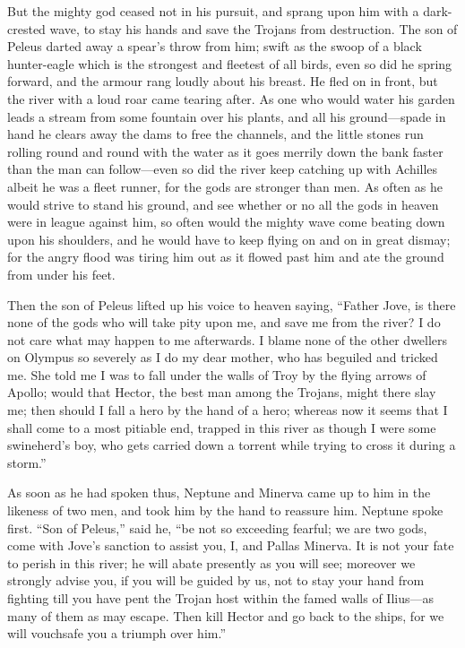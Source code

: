 But the mighty god ceased not in his pursuit, and sprang upon him with a
dark-crested wave, to stay his hands and save the Trojans from
destruction. The son of Peleus darted away a spear’s throw from him; swift
as the swoop of a black hunter-eagle which is the strongest and fleetest
of all birds, even so did he spring forward, and the armour rang loudly
about his breast. He fled on in front, but the river with a loud roar came
tearing after. As one who would water his garden leads a stream from some
fountain over his plants, and all his ground—spade in hand he clears
away the dams to free the channels, and the little stones run rolling
round and round with the water as it goes merrily down the bank faster
than the man can follow—even so did the river keep catching up with
Achilles albeit he was a fleet runner, for the gods are stronger than men.
As often as he would strive to stand his ground, and see whether or no all
the gods in heaven were in league against him, so often would the mighty
wave come beating down upon his shoulders, and he would have to keep
flying on and on in great dismay; for the angry flood was tiring him out
as it flowed past him and ate the ground from under his feet.

Then the son of Peleus lifted up his voice to heaven saying, “Father Jove,
is there none of the gods who will take pity upon me, and save me from the
river? I do not care what may happen to me afterwards. I blame none of the
other dwellers on Olympus so severely as I do my dear mother, who has
beguiled and tricked me. She told me I was to fall under the walls of Troy
by the flying arrows of Apollo; would that Hector, the best man among the
Trojans, might there slay me; then should I fall a hero by the hand of a
hero; whereas now it seems that I shall come to a most pitiable end,
trapped in this river as though I were some swineherd’s boy, who gets
carried down a torrent while trying to cross it during a storm.”

As soon as he had spoken thus, Neptune and Minerva came up to him in the
likeness of two men, and took him by the hand to reassure him. Neptune
spoke first. “Son of Peleus,” said he, “be not so exceeding fearful; we
are two gods, come with Jove’s sanction to assist you, I, and Pallas
Minerva. It is not your fate to perish in this river; he will abate
presently as you will see; moreover we strongly advise you, if you will be
guided by us, not to stay your hand from fighting till you have pent the
Trojan host within the famed walls of Ilius—as many of them as may
escape. Then kill Hector and go back to the ships, for we will vouchsafe
you a triumph over him.”

